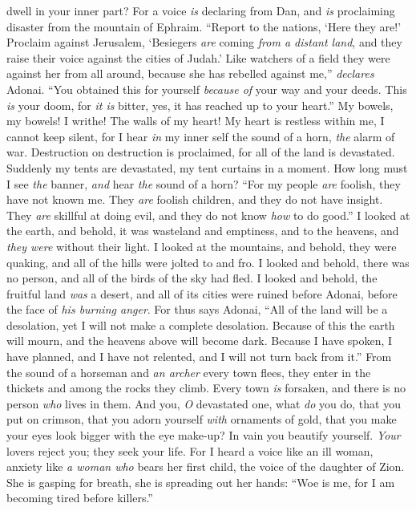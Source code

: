 \begin{biblechapter}
dwell in your inner part?
\verse For a voice \textit{is} declaring from Dan, 
and \textit{is} proclaiming disaster from the mountain of Ephraim.
\verse “Report to the nations, ‘Here they are!’ 
Proclaim against Jerusalem, 
‘Besiegers \textit{are} coming \textit{from a distant land}, 
and they raise their voice against the cities of Judah.’
\verse Like watchers of a field they were against her from all around, 
because she has rebelled against me,” \textit{declares} Adonai.
\verse “You obtained this for yourself 
\textit{because of} your way and your deeds. 
This \textit{is} your doom, for \textit{it is} bitter, 
yes, it has reached up to your heart.”
\verse My bowels, my bowels! I writhe! 
The walls of my heart! 
My heart is restless within me, I cannot keep silent, 
for I hear \textit{in} my inner self the sound of a horn, \textit{the} alarm of war.
\verse Destruction on destruction is proclaimed, 
for all of the land is devastated. 
Suddenly my tents are devastated, 
my tent curtains in a moment.
\verse How long must I see \textit{the} banner, 
\textit{and} hear \textit{the} sound of a horn?
\verse “For my people \textit{are} foolish, 
they have not known me. 
They \textit{are} foolish children, 
and they do not have insight. 
They \textit{are} skillful at doing evil, 
and they do not know \textit{how} to do good.”
\verse I looked at the earth, and behold, it was wasteland and emptiness, 
and to the heavens, and \textit{they were} without their light.
\verse I looked at the mountains, and behold, they were quaking, 
and all of the hills were jolted to and fro.
\verse I looked and behold, there was no person, 
and all of the birds of the sky had fled.
\verse I looked and behold, the fruitful land \textit{was} a desert, 
and all of its cities were ruined before Adonai, 
before the face of \textit{his burning anger}.
\verse For thus says Adonai, “All of the land will be a desolation, 
yet I will not make a complete desolation.
\verse Because of this the earth will mourn, 
and the heavens above will become dark. 
Because I have spoken, I have planned, 
and I have not relented, and I will not turn back from it.”
\verse From the sound of a horseman and \textit{an archer} every town flees, 
they enter in the thickets and among the rocks they climb. 
Every town \textit{is} forsaken, 
and there is no person \textit{who} lives in them.
\verse And you, \textit{O} devastated one, what \textit{do} you do, 
that you put on crimson, 
that you adorn yourself \textit{with} ornaments of gold, 
that you make your eyes look bigger with the eye make-up? 
In vain you beautify yourself. 
\textit{Your} lovers reject you; 
they seek your life.
\verse For I heard a voice like an ill woman, 
anxiety like \textit{a woman who} bears her first child, 
the voice of the daughter of Zion. 
She is gasping for breath, 
she is spreading out her hands: 
“Woe is me, for I am becoming tired before killers.”
\end{biblechapter}

